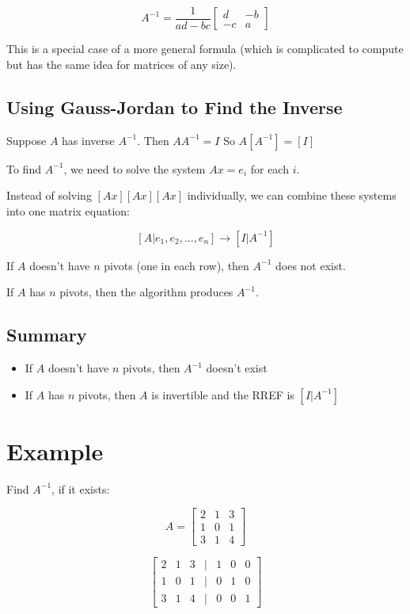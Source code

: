 \documentclass[12pt,a4paper]{article}
\begin{document}
\[A^{-1} = \frac{1}{ad-bc} \begin{bmatrix} d & -b \\ -c & a \end{bmatrix}\]

This is a special case of a more general formula (which is complicated to compute but has the same idea for matrices of any size).

\subsection{Using Gauss-Jordan to Find the Inverse}

Suppose $A$ has inverse $A^{-1}$.
Then $AA^{-1} = I$
So $A[A^{-1}] = [I]$

To find $A^{-1}$, we need to solve the system $Ax = e_i$ for each $i$.

Instead of solving $[Ax][Ax][Ax]$ individually, we can combine these systems into one matrix equation:

\[[A|e_1, e_2, ..., e_n] \to [I|A^{-1}]\]

If $A$ doesn't have $n$ pivots (one in each row), then $A^{-1}$ does not exist.

If $A$ has $n$ pivots, then the algorithm produces $A^{-1}$.

\subsection{Summary}
\begin{itemize}
    \item If $A$ doesn't have $n$ pivots, then $A^{-1}$ doesn't exist
    \item If $A$ has $n$ pivots, then $A$ is invertible and the RREF is $[I|A^{-1}]$
\end{itemize}

\section{Example}

Find $A^{-1}$, if it exists:

\[A = \begin{bmatrix} 2 & 1 & 3 \\ 1 & 0 & 1 \\ 3 & 1 & 4 \end{bmatrix}\]

\[
\begin{bmatrix}
2 & 1 & 3 & | & 1 & 0 & 0 \\
1 & 0 & 1 & | & 0 & 1 & 0 \\
3 & 1 & 4 & | & 0 & 0 & 1
\end{bmatrix}
\]
\end{document}
